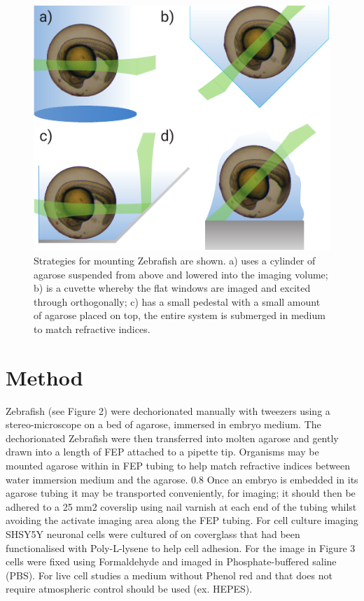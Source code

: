 \begin{figure}
    \centering
    \includegraphics{./mounting_straegies_fish}
    \caption{Strategies for mounting Zebrafish are shown.
    a) uses a cylinder of agarose suspended from above and lowered into the imaging volume;
    b) is a cuvette whereby the flat windows are imaged and excited through orthogonally;
    c) has a small pedestal with a small amount of agarose placed on top, the entire system is submerged in medium to match refractive indices.}
    \label{fig:mounting_straegies_fish}
\end{figure}

\section{Method}
Zebrafish (see Figure 2) were dechorionated manually with tweezers using a stereo-microscope on a bed of agarose, immersed in embryo medium.
The dechorionated Zebrafish were then transferred into molten agarose and gently drawn into a length of FEP attached to a pipette tip.
Organisms may be mounted agarose within in FEP tubing to help match refractive indices between water immersion medium and the agarose.
0.8%
Once an embryo is embedded in its agarose tubing it may be transported conveniently, for imaging; it should then be adhered to a 25 mm2 coverslip using nail varnish at each end of the tubing whilst avoiding the activate imaging area along the FEP tubing.
For cell culture imaging SHSY5Y neuronal cells were cultured of on coverglass that had been functionalised with Poly-L-lysene to help cell adhesion.
For the image in Figure 3 cells were fixed using Formaldehyde and imaged in Phosphate-buffered saline (PBS).
For live cell studies a medium without Phenol red and that does not require atmospheric control should be used (ex.
HEPES).

